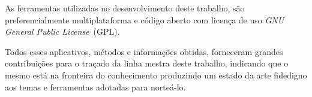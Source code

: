   As ferramentas utilizadas no desenvolvimento deste trabalho, são preferencialmente multiplataforma e código aberto com licença de uso \emph{GNU General Public License}~(GPL).

  Todos esses aplicativos, métodos e informações obtidas, forneceram grandes contribuições para o traçado da linha mestra deste trabalho, indicando que o mesmo está na fronteira do conhecimento produzindo um estado da arte fidedigno aos temas e ferramentas adotadas para norteá-lo.

\begin{center}
\end{center}

